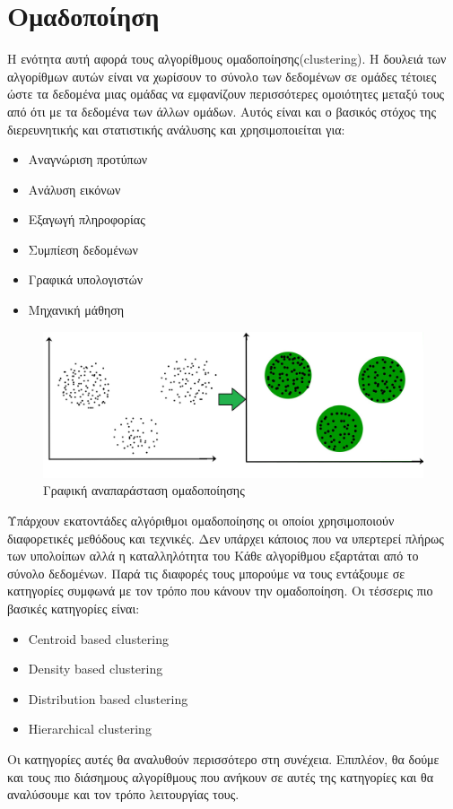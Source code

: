 \newpage
\section{Ομαδοποίηση}
Η ενότητα αυτή αφορά τους αλγορίθμους ομαδοποίησης(\textlatin{clustering}). Η δουλειά των
αλγορίθμων αυτών είναι να χωρίσουν το σύνολο των δεδομένων σε ομάδες τέτοιες ώστε τα δεδομένα μιας
ομάδας να εμφανίζουν περισσότερες ομοιότητες μεταξύ τους από ότι με τα δεδομένα των άλλων ομάδων.
Αυτός είναι και ο βασικός στόχος της διερευνητικής και στατιστικής ανάλυσης και χρησιμοποιείται
για\cite{wikicl}:
\begin{itemize}
    \item Αναγνώριση προτύπων
    \item Ανάλυση εικόνων
    \item Εξαγωγή πληροφορίας
    \item Συμπίεση δεδομένων
    \item Γραφικά υπολογιστών
    \item Μηχανική μάθηση
\end{itemize}
\begin{figure}[H]
    \centering
    \includegraphics[width=1\textwidth]{images/clustering_intro.jpg}
    \caption{Γραφική αναπαράσταση ομαδοποίησης}
\end{figure}
\sloppy
Υπάρχουν εκατοντάδες αλγόριθμοι ομαδοποίησης οι οποίοι χρησιμοποιούν διαφορετικές μεθόδους και
τεχνικές. Δεν υπάρχει κάποιος που να υπερτερεί πλήρως των υπολοίπων αλλά η καταλληλότητα του Κάθε
αλγορίθμου εξαρτάται από το σύνολο δεδομένων. Παρά τις διαφορές τους μπορούμε να τους εντάξουμε σε
κατηγορίες συμφωνά με τον τρόπο που κάνουν την ομαδοποίηση. Οι τέσσερις πιο βασικές κατηγορίες
είναι:
\fussy
\begin{itemize}
    \item \textlatin{Centroid based clustering}
    \item \textlatin{Density based clustering}
    \item \textlatin{Distribution based clustering}
    \item \textlatin{Hierarchical clustering}
\end{itemize}
Οι κατηγορίες αυτές θα αναλυθούν περισσότερο στη συνέχεια. Επιπλέον, θα δούμε και τους πιο διάσημους αλγορίθμους που ανήκουν σε αυτές της κατηγορίες και θα αναλύσουμε και τον τρόπο
λειτουργίας τους.

